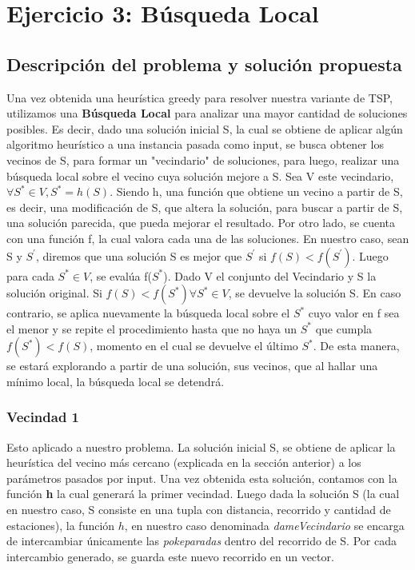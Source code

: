 \section{Ejercicio 3: Búsqueda Local}
    \subsection{Descripción del problema y solución propuesta}

   Una vez obtenida una heurística greedy para resolver nuestra variante de TSP, utilizamos una \textbf{Búsqueda Local} para analizar una mayor cantidad de soluciones posibles. Es decir, dado una solución inicial S, la cual se obtiene de aplicar algún algoritmo heurístico a una instancia pasada como input, se busca obtener los vecinos de S, para formar un "vecindario" de soluciones, para luego, realizar una búsqueda local sobre el vecino cuya solución mejore a S. Sea V este vecindario, $\forall S^{*}\in V, S^{*} = h(S)$. Siendo h, una función que obtiene un vecino a partir de S, es decir, una modificación de S, que altera la solución, para buscar a partir de S, una solución parecida, que pueda mejorar el resultado. Por otro lado, se cuenta con una función f, la cual valora cada una de las soluciones. En nuestro caso, sean S y $S^{'}$, diremos que una solución S es mejor que $S^{'}$ si $f(S) < f(S^{'})$. Luego para cada $S^{*}\in V$, se evalúa f($S^{*}$). Dado V el conjunto del Vecindario y S la solución original. Si $f(S)<f(S^{*}) \forall S^{*}\in V$, se devuelve la solución S. En caso contrario, se aplica nuevamente la búsqueda local sobre el $S^{*}$ cuyo valor en f sea el menor y se repite el procedimiento hasta que no haya un $S^{*}$ que cumpla $f(S^{*})<f(S)$, momento en el cual se devuelve el último $S^{*}$. De esta manera, se estará explorando a partir de una solución, sus vecinos, que al hallar una mínimo local, la búsqueda local se detendrá.

    \subsubsection{Vecindad 1}

    \par Esto aplicado a nuestro problema. La solución inicial S, se obtiene de aplicar la heurística del vecino más cercano (explicada en la sección anterior) a los parámetros pasados por input. Una vez obtenida esta solución, contamos con la función \textbf{h} la cual generará la primer vecindad. Luego dada la solución S (la cual en nuestro caso, S consiste en una tupla con distancia, recorrido y cantidad de estaciones), la función $h$, en nuestro caso denominada \emph{dameVecindario} se encarga de intercambiar únicamente las \emph{pokeparadas} dentro del recorrido de S. Por cada intercambio generado, se guarda este nuevo recorrido en un vector.

